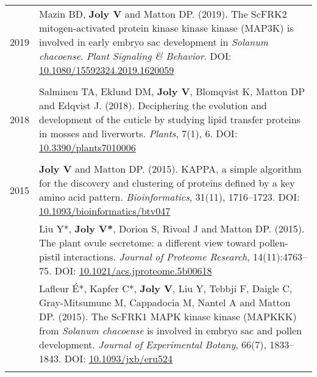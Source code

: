 \documentclass[letterpaper,12pt]{article}
\begin{document}
\begin{tabularx}{\textwidth}{@{}r|X@{}}

2019
& Mazin BD, \textbf{Joly V} and Matton DP. (2019).
  The ScFRK2 mitogen-activated protein kinase kinase kinase (MAP3K) is involved
  in early embryo sac development in \emph{Solanum chacoense}.
  \emph{Plant Signaling \& Behavior}.
  DOI: \href{http://doi.org/10.1080/15592324.2019.1620059}
  {10.1080/15592324.2019.1620059}
  \\

\multicolumn{2}{c}{} \\

2018
& Salminen TA, Eklund DM, \textbf{Joly V}, Blomqvist K, Matton DP
  and Edqvist J. (2018).
  Deciphering the evolution and development of the cuticle by studying lipid
  transfer proteins in mosses and liverworts.
  \emph{Plants}, 7(1), 6.
  DOI: \href{http://doi.org/10.3390/plants7010006}{10.3390/plants7010006}
  \\

\multicolumn{2}{c}{} \\

2015
& \textbf{Joly V} and Matton DP. (2015).
  KAPPA, a simple algorithm for the discovery and clustering of proteins defined
  by a key amino acid pattern.
  \emph{Bioinformatics}, 31(11), 1716--1723.
  DOI: \href{http://doi.org/10.1093/bioinformatics/btv047}
  {10.1093/bioinformatics/btv047}
  \vspace{3mm}
  \\

& Liu Y*, \textbf{Joly V*}, Dorion S, Rivoal J and Matton DP. (2015).
  The plant ovule secretome: a different view toward pollen-pistil interactions.
  \emph{Journal of Proteome Research}, 14(11):4763--75.
  DOI: \href{http://doi.org/10.1021/acs.jproteome.5b00618}
  {10.1021/acs.jproteome.5b00618}
  \vspace{3mm}
  \\

& Lafleur É*, Kapfer C*, \textbf{Joly V}, Liu Y, Tebbji F, Daigle C,
  Gray-Mitsumune M, Cappadocia M, Nantel A and Matton DP. (2015).
  The ScFRK1 MAPK kinase kinase (MAPKKK) from \emph{Solanum chacoense} is
  involved in embryo sac and pollen development.
  \emph{Journal of Experimental Botany}, 66(7), 1833--1843.
  DOI: \href{http://doi.org/10.1093/jxb/eru524}{10.1093/jxb/eru524}
  \\

\multicolumn{2}{c}{} \\


\end{tabularx}
\end{document}
